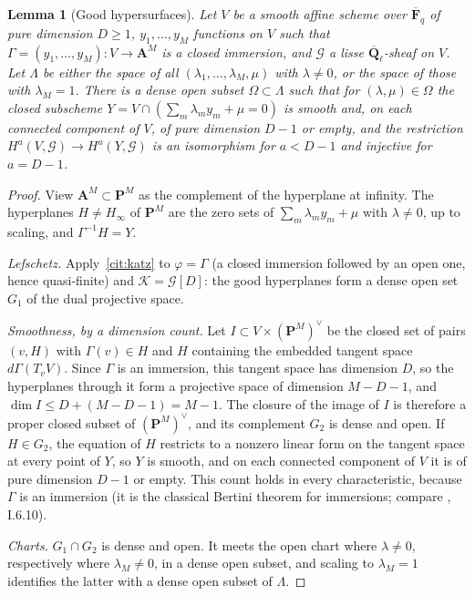 \documentclass[11pt,a4paper]{article}
\theoremstyle{plain}
\newtheorem{lemma}[theorem]{Lemma}
\theoremstyle{definition}
\theoremstyle{remark}
\newcommand{\uses}[1]{\par\noindent{\small\textsf{Uses:} #1}\par\smallskip}
\newcommand{\Fqb}{\overline{\mathbf F}_q}
\newcommand{\Ql}{\overline{\mathbf Q}_\ell}
\newcommand{\A}{\mathbf A}
\begin{document}
\begin{lemma}[Good hypersurfaces]\label{lem:good}
Let $V$ be a smooth affine scheme over $\Fqb$ of pure dimension $D\ge1$, $y_1,\dots,y_M$ functions on $V$ such that
$\Gamma=(y_1,\dots,y_M):V\to\A^M$ is a closed immersion, and $\mathcal G$ a lisse $\Ql$-sheaf on $V$. Let $\Lambda$ be
either the space of all $(\lambda_1,\dots,\lambda_M,\mu)$ with $\lambda\ne0$, or the space of those with $\lambda_M=1$.
There is a dense open subset $\Omega\subset\Lambda$ such that for $(\lambda,\mu)\in\Omega$ the closed subscheme
$Y=V\cap(\sum_m\lambda_my_m+\mu=0)$ is smooth and, on each connected component of $V$, of pure dimension $D-1$ or empty,
and the restriction $H^a(V,\mathcal G)\to H^a(Y,\mathcal G)$ is an isomorphism for $a<D-1$ and injective for $a=D-1$.
\end{lemma}
\begin{proof}
View $\A^M\subset\mathbf P^M$ as the complement of the hyperplane at infinity. The hyperplanes $H\ne H_\infty$ of
$\mathbf P^M$ are the zero sets of $\sum_m\lambda_my_m+\mu$ with $\lambda\ne0$, up to scaling, and $\Gamma^{-1}H=Y$.

\emph{Lefschetz.} Apply~\ref{cit:katz} to $\varphi=\Gamma$ (a closed immersion followed by an open one, hence quasi-finite)
and $\mathcal K=\mathcal G[D]$: the good hyperplanes form a dense open set $G_1$ of the dual projective space.

\emph{Smoothness, by a dimension count.} Let $I\subset V\times(\mathbf P^M)^\vee$ be the closed set of pairs $(v,H)$ with
$\Gamma(v)\in H$ and $H$ containing the embedded tangent space $d\Gamma(T_vV)$. Since $\Gamma$ is an immersion, this tangent
space has dimension $D$, so the hyperplanes through it form a projective space of dimension $M-D-1$, and
$\dim I\le D+(M-D-1)=M-1$. The closure of the image of $I$ is therefore a proper closed subset of $(\mathbf P^M)^\vee$, and
its complement $G_2$ is dense and open. If $H\in G_2$, the equation of $H$ restricts to a nonzero linear form on the
tangent space at every point of $Y$, so $Y$ is smooth, and on each connected component of $V$ it is of pure dimension
$D-1$ or empty. This count holds in every characteristic, because $\Gamma$ is an immersion (it is the classical Bertini
theorem for immersions; compare \cite{Jouanolou}, I.6.10).

\emph{Charts.} $G_1\cap G_2$ is dense and open. It meets the open chart where $\lambda\ne0$, respectively where
$\lambda_M\ne0$, in a dense open subset, and scaling to $\lambda_M=1$ identifies the latter with a dense open subset of
$\Lambda$.
\end{proof}
\uses{\ref{cit:katz}.}
\end{document}
